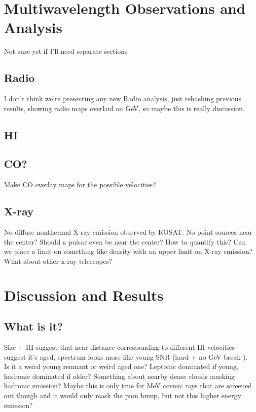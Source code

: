 \documentclass[preprint2]{aastex}
\begin{document}
\section{\label{sec:Multiwave}Multiwavelength  Observations and  Analysis }
Not sure yet if I'll need separate sections
\subsection{\label{sec:Radio}Radio}
I don't think we're presenting any new Radio analysis, just rehashing previous results, showing radio maps overlaid on GeV, so maybe this is really discussion.
\citep{Gao14}
\subsection{\label{sec:HI}HI}
\subsection{\label{sec:CO}CO?}
Make CO overlay maps for the possible velocities?
\subsection{\label{sec:Xray}X-ray}
No diffuse nonthermal X-ray emission observed by ROSAT. No point sources near the center? Should a  pulsar even  be near the center? How to quantify this? Can we place a limit on something like density with an upper limit on X-ray emission? What about other x-ray telescopes?

%
%
\section{\label{sec:Discuss}Discussion and Results}
\subsection{\label{sec:What}What is it?}
Size + HI suggest that near distance corresponding to different HI velocities suggest it's aged, spectrum looks more like young SNR (hard + no GeV break ). Is it a weird young remnant or weird aged one? Leptonic dominated if young, hadronic dominated if older? Something about nearby dense clouds masking hadronic emission? Maybe this is only true for MeV cosmic rays that are screened out though and it would only mask the pion bump, but not this higher energy emission?
\end{document}
